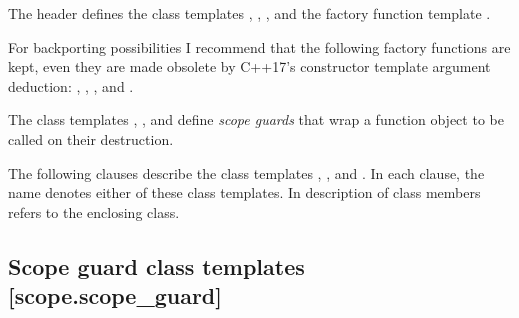 \documentclass[ebook,11pt,article]{memoir}
\begin{document}
\pnum
The header   defines the class templates , , ,  and
the factory function template .
\begin{note}
For backporting possibilities I recommend that the following factory functions are kept, even they are made obsolete by C++17's constructor template argument deduction:
, , , and
.
\end{note}

\pnum 
The class templates , , and  define\emph{ scope guards} that wrap a function object to be called on their destruction.

\pnum
The following clauses describe the class templates , , and . In each clause, the name  denotes either of these class templates. In description of class members  refers to the enclosing class.

\newpage
\subsection {Scope guard class templates [scope.scope_guard]}
\end{document}
